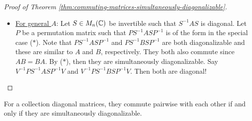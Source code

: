 \begin{proof}[Proof of Theorem \ref{thm:commuting-matrices-simultaneously-diagonalizable}]
\begin{itemize}
    \item \underline{For general $A$}: Let $S \in M_n(\mathbb C)$ be invertible such that $S^{-1}AS$ is diagonal. Let $P$ be a permutation matrix such that $PS^{-1}ASP^{-1}$ is of the form in the special case ($*$). Note that $PS^{-1}ASP^{-1}$ and $PS^{-1}BSP^{-1}$ are both diagonalizable and these are similar to $A$ and $B$, respectively. They both also commute since $AB = BA$. By ($*$), then they are simultaneously diagonalizable. Say $V^{-1}PS^{-1}ASP^{-1}V$ and $V^{-1}PS^{-1}BSP^{-1}V$. Then both are diagonal!
\end{itemize}
\end{proof}

\begin{proposition}
For a collection diagonal matrices, they commute pairwise with each other if and only if they are simultaneously diagonalizable.
\end{proposition}
